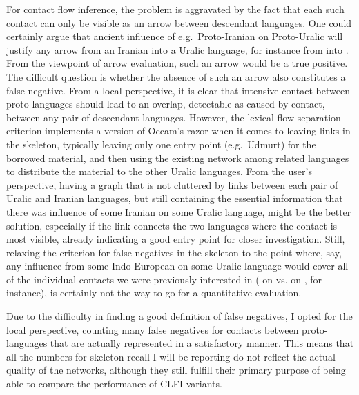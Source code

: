 For contact flow inference, the problem is aggravated by the fact that each such contact can only be visible as an arrow between descendant languages. One could certainly argue that ancient influence of e.g.\ Proto-Iranian on Proto-Uralic will justify any arrow from an Iranian into a Uralic language, for instance from  into . From the viewpoint of arrow evaluation, such an arrow would be a true positive. The difficult question is whether the absence of such an arrow also constitutes a false negative. From a local perspective, it is clear that intensive contact between proto-languages should lead to an overlap, detectable as caused by contact, between any pair of descendant languages. However, the lexical flow separation criterion implements a version of Occam's razor when it comes to leaving links in the skeleton, typically leaving only one entry point (e.g.\ Udmurt) for the borrowed material, and then using the existing network among 
related languages to distribute the material to the other Uralic languages. From the user's perspective, having a graph that is not cluttered by links between each pair of Uralic and Iranian languages, but still containing the essential information that there was influence of some Iranian on some Uralic language, might be the better solution, especially if the link connects the two languages where the contact is most visible, already indicating a good entry point for closer investigation. Still, relaxing the criterion for false negatives in the skeleton to the point where, say, any influence from some Indo-European on some Uralic language would cover all of the individual contacts we were previously interested in ( on  vs.  on , for instance), is certainly not the way to go for a quantitative evaluation.

Due to the difficulty in finding a good definition of false negatives, I opted for the local perspective, counting many false negatives for contacts between proto-languages that are actually represented in a satisfactory manner. This means that all the numbers for skeleton recall I will be reporting do not reflect the actual quality of the networks, although they still fulfill their primary purpose of being able to compare the performance of CLFI variants.

